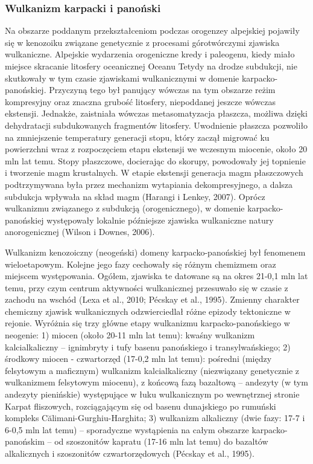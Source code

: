 \documentclass[11.5pt,twoside]{report}
\begin{document}
	\subsubsection{Wulkanizm karpacki i panoński}

Na obszarze poddanym przekształceniom podczas orogenzey alpejskiej pojawiły się w kenozoiku związane genetycznie z procesami górotwórczymi zjawiska wulkaniczne. Alpejskie wydarzenia orogeniczne kredy i paleogenu, kiedy miało miejsce skracanie litosfery oceanicznej Oceanu Tetydy na drodze subdukcji, nie skutkowały w tym czasie zjawiskami wulkanicznymi w domenie karpacko-panońskiej. Przyczyną tego był panujący wówczas na tym obszarze reżim kompresyjny oraz znaczna grubość litosfery, niepoddanej jeszcze wówczas ekstensji. Jednakże, zaistniała wówczas metasomatyzacja płaszcza, możliwa dzięki dehydratacji subdukowanych fragmentów litosfery. Uwodnienie płaszcza pozwoliło na zmniejszenie temperatury generacji stopu, który zaczął migrować ku powierzchni wraz z rozpoczęciem etapu ekstensji we wczesnym miocenie, około 20 mln lat temu. Stopy płaszczowe, docierając do skorupy, powodowały jej topnienie i tworzenie magm krustalnych. W etapie ekstensji generacja magm płaszczowych podtrzymywana była przez mechanizm wytapiania dekompresyjnego, a dalsza subdukcja wpływała na skład magm (Harangi i Lenkey, 2007). Oprócz wulkanizmu związanego z subdukcją (orogenicznego), w domenie karpacko-panońskiej występowały lokalnie pó\'{z}niejsze zjawiska wulkaniczne natury anorogenicznej (Wilson i Downes, 2006).


Wulkanizm kenozoiczny (neogeński) domeny karpacko-panońskiej był fenomenem wieloetapowym. Kolejne jego fazy cechowały się różnym chemizmem oraz miejscem występowania. Ogółem, zjawiska te datowane są na okres 21-0,1 mln lat temu, przy czym centrum aktywności wulkanicznej przesuwało się w czasie z zachodu na wschód (Lexa et al., 2010; P\'{e}cskay et al., 1995). Zmienny charakter chemiczny zjawisk wulkanicznych odzwierciedlał różne epizody tektoniczne w rejonie. Wyróżnia się trzy główne etapy wulkanizmu karpacko-panońskiego w neogenie: 1) miocen (około 20-11 mln lat temu): kwaśny wulkanizm kalcialkaliczny -- ignimbryty i tufy basenu panońskiego i transylwańskiego; 2) środkowy miocen - czwartorzęd (17-0,2 mln lat temu): pośredni (między felsytowym a maficznym) wulkanizm kalcialkaliczny (niezwiązany genetycznie z wulkanizmem felsytowym miocenu), z końcową fazą bazaltową -- andezyty (w tym andezyty pienińskie) występujące w łuku wulkanicznym po wewnętrznej stronie Karpat fliszowych, rozciągającym się od basenu dunajskiego po rumuński kompleks Călimani-Gurghiu-Harghita; 3) wulkanizm alkaliczny (dwie fazy: 17-7 i 6-0,5 mln lat temu) -- sporadyczne wystąpienia na całym obszarze karpacko-panońskim -- od szoszonitów kapratu (17-16 mln lat temu) do bazaltów alkalicznych i szoszonitów czwartorzędowych (P\'{e}cskay et al., 1995).
  
\end{document}

